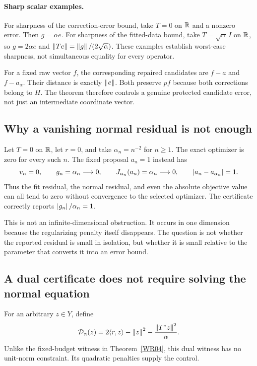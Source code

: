 \paragraph{Sharp scalar examples.} For sharpness of the correction-error bound, take $T=0$ on $\mathbb R$ and a nonzero error. Then $g=\alpha e$. For sharpness of the fitted-data bound, take $T=\sqrt\alpha\,I$ on $\mathbb R$, so $g=2\alpha e$ and $\left\lVert Te\right\rVert=\left\lVert g\right\rVert/(2\sqrt\alpha)$. These examples establish worst-case sharpness, not simultaneous equality for every operator.

For a fixed raw vector $f$, the corresponding repaired candidates are $f-a$ and $f-a_\alpha$. Their distance is exactly $\left\lVert e\right\rVert$. Both preserve $pf$ because both corrections belong to $H$. The theorem therefore controls a genuine protected candidate error, not just an intermediate coordinate vector.


\subsection{Why a vanishing normal residual is not enough}
Let $T=0$ on $\mathbb R$, let $r=0$, and take $\alpha_n=n^{-2}$ for $n\ge1$. The exact optimizer is zero for every such $n$. The fixed proposal $a_n=1$ instead has
\[
 v_n=0,\qquad g_n=\alpha_n\longrightarrow0,\qquad
 J_{\alpha_n}(a_n)=\alpha_n\longrightarrow0,
 \qquad\left\lvert a_n-a_{\alpha_n}\right\rvert=1.
\]
Thus the fit residual, the normal residual, and even the absolute objective value can all tend to zero without convergence to the selected optimizer. The certificate correctly reports $\left\lvert g_n\right\rvert/\alpha_n=1$.

This is not an infinite-dimensional obstruction. It occurs in one dimension because the regularizing penalty itself disappears. The question is not whether the reported residual is small in isolation, but whether it is small relative to the parameter that converts it into an error bound.

\subsection{A dual certificate does not require solving the normal equation}
For an arbitrary $z\in Y$, define
\[
 \mathcal D_\alpha(z)=2\langle r,z\rangle-\left\lVert z\right\rVert^2
                    -\frac{\left\lVert T^*z\right\rVert^2}{\alpha}.
\]
Unlike the fixed-budget witness in Theorem~\ref{WR04}, this dual witness has no unit-norm constraint. Its quadratic penalties supply the control.

